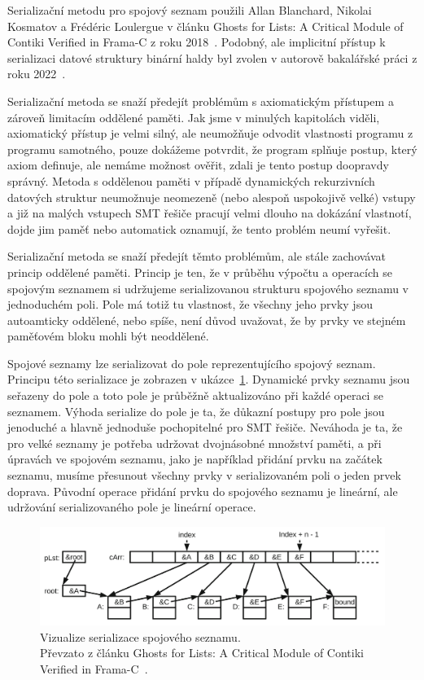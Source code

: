 Serializační metodu pro spojový seznam použili
Allan Blanchard, Nikolai Kosmatov a Frédéric Loulergue
v článku Ghosts for Lists: A Critical Module of Contiki Verified in Frama-C
z roku 2018~\cite{FCGhostsForLists}.
Podobný, ale implicitní přístup k serializaci datové struktury binární haldy
byl zvolen v autorově bakalářské práci z roku 2022~\cite{ZapotocnyBinarniHalda}.

Serializační metoda se snaží předejít problémům s axiomatickým přístupem
a zároveň limitacím oddělené paměti.
Jak jsme v minulých kapitolách viděli,
axiomatický přístup je velmi silný, ale neumožňuje odvodit vlastnosti programu z programu samotného,
pouze dokážeme potvrdit, že program splňuje postup, který axiom definuje, ale nemáme možnost ověřit,
zdali je tento postup doopravdy správný.
Metoda s oddělenou paměti v případě dynamických rekurzivních datových struktur neumožnuje
neomezeně (nebo alespoň uspokojivě velké) vstupy a již na malých vstupech SMT řešiče pracují velmi dlouho na dokázání vlastnotí,
dojde jim paměť nebo automatick oznamují, že tento problém neumí vyřešit.

Serializační metoda se snaží předejít těmto problémům, ale stále zachovávat princip oddělené paměti.
Princip je ten, že v průběhu výpočtu a operacích se spojovým seznamem si udržujeme serializovanou
strukturu spojového seznamu v jednoduchém poli.
Pole má totiž tu vlastnost, že všechny jeho prvky jsou autoamticky oddělené,
nebo spíše, není důvod uvažovat, že by prvky ve stejném paměťovém bloku mohli být neoddělené.

Spojové seznamy lze serializovat do pole reprezentujícího spojový seznam.
Principu této serializace je zobrazen v ukázce~\ref{fig:linked-list-serialization}.
Dynamické prvky seznamu jsou seřazeny do pole a toto pole je průběžně aktualizováno
při každé operaci se seznamem.
Výhoda serialize do pole je ta, že důkazní postupy pro pole jsou jenoduché
a hlavně jednoduše pochopitelné pro SMT řešiče.
Neváhoda je ta, že pro velké seznamy je potřeba udržovat dvojnásobné množství paměti,
a při úpravách ve spojovém seznamu, jako je například přidání prvku na začátek seznamu,
musíme přesunout všechny prvky v serializovaném poli o jeden prvek doprava.
Původní operace přidání prvku do spojového seznamu je lineární,
ale udržování serializovaného pole je lineární operace.

\begin{figure}[H]
    \centering
    \includegraphics[width=\linewidth]{images/list-serialized}
    \caption{
        Vizualize serializace spojového seznamu. \\
        Převzato z článku Ghosts for Lists: A Critical Module of Contiki Verified in Frama\mbox{-}C~\cite{FCGhostsForLists}.
    }
    \label{fig:linked-list-serialization}
\end{figure}

